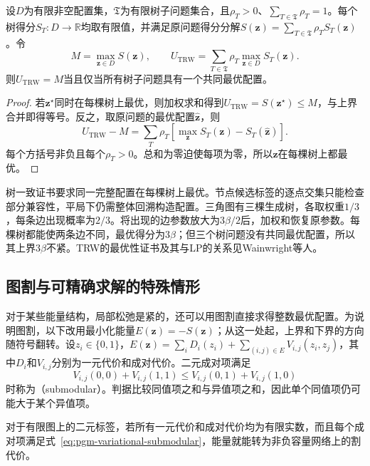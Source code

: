 \begin{lemma}[树一致的最优性证书]
  \label{lem:pgm-variational-tree-agreement}
  设$D$为有限非空配置集，$\mathfrak T$为有限树子问题集合，且$\rho_T>0$、$\sum_{T\in\mathfrak T}\rho_T=1$。每个树得分$S_T:D\to\mathbb R$均取有限值，并满足原问题得分分解$S(\bm z)=\sum_{T\in\mathfrak T}\rho_TS_T(\bm z)$。令
  \[
    M=\max_{\bm z\in D}S(\bm z),
    \qquad
    U_{\mathrm{TRW}}
      =\sum_{T\in\mathfrak T}\rho_T
         \max_{\bm z\in D}S_T(\bm z).
  \]
  则$U_{\mathrm{TRW}}=M$当且仅当所有树子问题具有一个共同最优配置。
\end{lemma}
\begin{proof}
  若$\bm z^\star$同时在每棵树上最优，则加权求和得到$U_{\mathrm{TRW}}=S(\bm z^\star)\leq M$，与上界合并即得等号。反之，取原问题的最优配置$\widehat{\bm z}$，则
  \[
    U_{\mathrm{TRW}}-M
      =\sum_T\rho_T
         \left[\max_{\bm z}S_T(\bm z)-S_T(\widehat{\bm z})\right].
  \]
  每个方括号非负且每个$\rho_T>0$。总和为零迫使每项为零，所以$\widehat{\bm z}$在每棵树上都最优。
\end{proof}

树一致证书要求同一完整配置在每棵树上最优。节点候选标签的逐点交集只能检查部分兼容性，平局下仍需整体回溯构造配置。三角图有三棵生成树，各取权重$1/3$，每条边出现概率为$2/3$。将出现的边参数放大为$3\beta/2$后，加权和恢复原参数。每棵树都能使两条边不同，最优得分为$3\beta$；但三个树问题没有共同最优配置，所以其上界$3\beta$不紧。TRW的最优性证书及其与LP的关系见Wainwright等人。

\subsection{图割与可精确求解的特殊情形}
\label{sec:pgm-variational-graph-cut-special}
\label{sec:pgm-variational-graph-cuts}

对于某些能量结构，局部松弛是紧的，还可以用图割直接求得整数最优配置。为说明图割，以下改用最小化能量$E(\bm z)=-S(\bm z)$；从这一处起，上界和下界的方向随符号翻转。设$z_i\in\{0,1\}$，$E(\bm z)=\sum_iD_i(z_i)+\sum_{(i,j)\in E}V_{i,j}(z_i,z_j)$，其中$D_i$和$V_{i,j}$分别为一元代价和成对代价。二元成对项满足
\begin{equation}
  V_{i,j}(0,0)+V_{i,j}(1,1)
    \leq V_{i,j}(0,1)+V_{i,j}(1,0)
  \label{eq:pgm-variational-submodular}
\end{equation}
时称为（submodular）。判据比较同值项之和与异值项之和，因此单个同值项仍可能大于某个异值项。

对于有限图上的二元标签，若所有一元代价和成对代价均为有限实数，而且每个成对项满足式~\eqref{eq:pgm-variational-submodular}，能量就能转为非负容量网络上的割代价。

